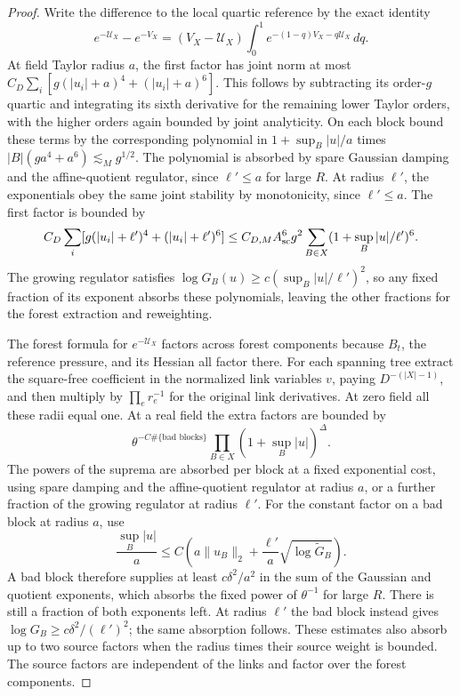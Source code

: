 \documentclass[11pt]{article}
\begin{document}
\begin{proof}
Write the difference to the local quartic reference by the exact
identity
\[
 e^{-\mathcal U_X}-e^{-V_X}
  =(V_X-\mathcal U_X)\int_0^1e^{-(1-q)V_X-q\mathcal U_X}\,dq .
\]
At field Taylor radius \(a\), the first factor has joint norm
at most \(C_D\sum_i[g(|u_i|+a)^4+(|u_i|+a)^6]\). This follows by
subtracting its order-\(g\) quartic and integrating its sixth
derivative for the remaining lower Taylor orders, with the higher
orders again bounded by joint analyticity. On each block bound
these terms by the corresponding polynomial in
\(1+\sup_B|u|/a\) times \(|B|(ga^4+a^6)\lesssim_M g^{1/2}\).
The polynomial is absorbed by spare Gaussian damping and the
affine-quotient regulator, since \(\ell'\le a\) for large \(R\).
At radius \(\ell'\), the exponentials obey the same joint
stability by monotonicity, since \(\ell'\le a\). The first
factor is bounded by
\[
 C_D\sum_i[g(|u_i|+\ell')^4+(|u_i|+\ell')^6]
 \le C_{D,M}A_{\rm sc}^6g^2\sum_{B\in X}(1+\sup_B|u|/\ell')^6.
\]
The growing regulator satisfies
\(\log G_B(u)\ge c(\sup_B|u|/\ell')^2\), so any fixed
fraction of its exponent absorbs these polynomials, leaving
the other fractions for the forest extraction and reweighting.

The forest formula for \(e^{-\mathcal U_X}\) factors across forest
components because \(B_t\), the reference pressure, and its Hessian
all factor there. For each spanning tree extract the square-free
coefficient in the normalized link variables \(v\), paying
\(D^{-(|X|-1)}\), and then multiply by \(\prod_e r_e^{-1}\)
for the original link derivatives. At zero field all these
radii equal one. At a real field the extra factors are bounded by
\[
 \theta^{-C\#\{\text{bad blocks}\}}
             \prod_{B\in X}(1+\sup_B|u|)^{\Delta}.
\]
The powers of the suprema are absorbed per block at a fixed
exponential cost, using spare damping and the affine-quotient
regulator at radius \(a\), or a further fraction of the growing
regulator at radius \(\ell'\). For the constant factor on a
bad block at radius \(a\), use
\[
 \frac{\sup_B|u|}{a}\le C\left(a\|u_B\|_2
              +\frac{\ell'}a\sqrt{\log\widetilde G_B}\right).
\]
A bad block therefore supplies at least \(c\delta^2/a^2\) in the
sum of the Gaussian and quotient exponents, which absorbs the
fixed power of \(\theta^{-1}\) for large \(R\). There is still a
fraction of both exponents left. At radius \(\ell'\) the bad
block instead gives \(\log G_B\ge c\delta^2/(\ell')^2\);
the same absorption follows. These estimates also absorb up
to two source factors when the radius times their source weight
is bounded. The source factors are independent of the links and
factor over the forest components.


\end{proof}
\end{document}
